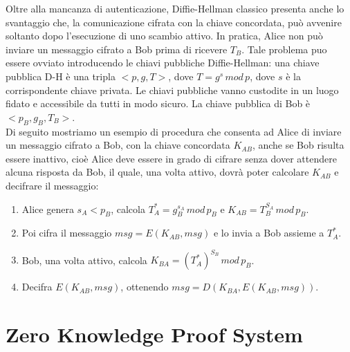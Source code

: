 Oltre alla mancanza di autenticazione, Diffie-Hellman classico presenta anche lo svantaggio che, la comunicazione cifrata con la chiave concordata, può avvenire soltanto dopo l'esecuzione di uno scambio attivo. In pratica, Alice non può inviare un messaggio cifrato a Bob prima di ricevere $T_{B}$. Tale problema puo essere ovviato
introducendo le chiavi pubbliche Diffie-Hellman: una chiave pubblica D-H è una tripla $<p, g, T>$, dove $T = g^s \, mod \, p$, dove $s$ è la corrispondente chiave privata. Le chiavi pubbliche vanno custodite in un luogo fidato e accessibile da tutti in modo sicuro. La chiave pubblica di Bob è $<p_{B}, g_{B}, T_{B}>$. \\

Di seguito mostriamo un esempio di procedura che consenta ad Alice di inviare un messaggio cifrato a Bob, con la chiave concordata $K_{AB}$, anche se Bob risulta essere inattivo, cioè Alice deve essere in grado di cifrare senza dover attendere alcuna risposta da Bob, il quale, una volta attivo, dovrà poter calcolare $K_{AB}$ e decifrare il messaggio:
\begin{enumerate}
\item Alice genera $s_{A}<p_{B}$, calcola $T_{A}^{*}=g_{B}^{s_{A}} \, mod \, p_{B}$ e $K_{AB}=T_{B}^{S_{A}} \, mod \, p_{B}$.
\item Poi cifra il messaggio $msg=E(K_{AB},msg)$ e lo invia a Bob assieme a $T_{A}^{*}$.
\item Bob, una volta attivo, calcola  $K_{BA}=(T_{A}^*)^{S_{B}} \, mod \, p_{B}$.
\item Decifra $E(K_{AB},msg)$, ottenendo $msg=D(K_{BA},E(K_{AB},msg))$.
\end{enumerate}

\section{Zero Knowledge Proof System}

